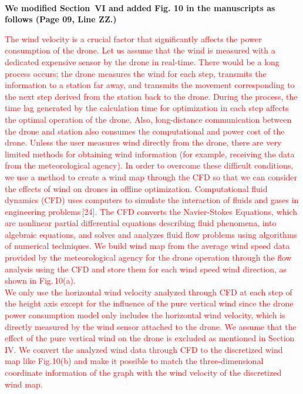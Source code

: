 \documentclass[onecolumn]{IEEEconf}
\begin{document}
\begin{description}
    ~\\
	\textbf{We modified Section~VI and added Fig. 10 in the manuscripts as follows (Page 09, Line ZZ.)}\\
    \begin{mdframed}[ linewidth=.75pt, userdefinedwidth=0.9\textwidth]
    \justify
    \textcolor{red}{The wind velocity is a crucial factor that significantly affects the power consumption of the drone. Let us assume that the wind is measured with a dedicated expensive sensor by the drone in real-time. There would be a long process occurs; 
    the drone measures the wind for each step, transmits the information to a station far away, and transmits the movement corresponding to the next step derived from the station back to the drone.
    During the process, the time lag generated by the calculation time for optimization in each step affects the optimal operation of the drone. 
    Also, long-distance communication between the drone and station also consumes the computational and power cost of the drone.
    Unless the user measures wind directly from the drone, there are very limited methods for obtaining wind information (for example, receiving the data from the meteorological agency).
    In order to overcome these difficult conditions, we use a method to create a wind map through the CFD so that we can consider the effects of wind on drones in offline optimization.
    Computational fluid dynamics (CFD) uses computers to simulate the interaction of fluids and gases in engineering problems\,[24]. 
    The CFD converts the Navier-Stokes Equations, which are nonlinear partial differential equations describing fluid phenomena, into algebraic equations, and solves and analyzes fluid flow problems using algorithms of numerical techniques.
    We build wind map from the average wind speed data provided by the meteorological agency for the drone operation through the flow analysis using the CFD and store them for each wind speed wind direction, as shown in Fig.\,10(a).}~\\
    \noindent\textcolor{red}{
    We only use the horizontal wind velocity analyzed through CFD at each step of the height axis except for the influence of the pure vertical wind since the drone power consumption model only includes the horizontal wind velocity, which is directly measured by the wind sensor attached to the drone. 
    We assume that the effect of the pure vertical wind on the drone is excluded as mentioned in Section IV.
    We convert the analyzed wind data through CFD to the discretized wind map like Fig.10(b) and make it possible to match the three-dimensional coordinate information of the graph with the wind velocity of the discretized wind map.
}
\end{mdframed}
\end{description}
\end{document}
